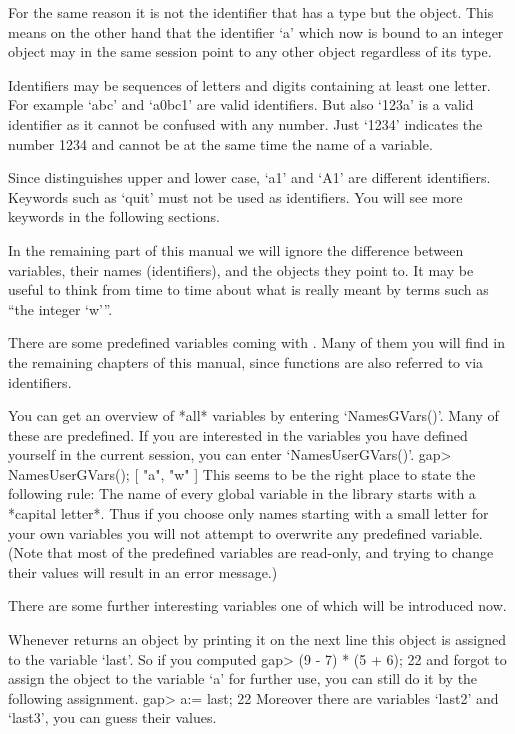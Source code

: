 For the  same reason it is  not the  identifier that has   a type but the
object.  This means  on the other hand that  the identifier `a' which now
is bound to an integer object may in the  same session point to any other
object regardless of its type.

Identifiers  may be sequences  of letters and digits containing at  least
one letter.   For example  `abc' and `a0bc1'  are valid identifiers.  But
also `123a'  is  a valid identifier as  it cannot be  confused  with  any
number.  Just `1234' indicates the  number 1234 and cannot be at the same
time the name of a variable.

Since  {\GAP} distinguishes  upper and  lower  case, `a1'  and  `A1'  are
different  identifiers.   Keywords  such as `quit'  must not  be used  as
identifiers.  You will see more keywords in the following sections.

In  the remaining  part of  this manual   we  will ignore the  difference
between variables, their names  (identifiers), and the objects they point
to.  It may be useful  to think from time  to  time about what is  really
meant by terms such as ``the integer `w'''.

There are some predefined variables coming with {\GAP}.  Many of them you
will find in the remaining  chapters of  this manual, since functions are
also referred to via identifiers.

You    can get   an  overview   of  *all*  {\GAP}   variables by entering
`NamesGVars()'.  Many of these are predefined.  If  you are interested in
the variables you  have defined yourself  in the current {\GAP}  session,
you can enter `NamesUserGVars()'.
\begintt
gap> NamesUserGVars();
[ "a", "w" ]
\endtt
This seems to be the  right place to state the  following rule:
The name of every global variable in the {\GAP} library starts with a
*capital letter*.
Thus if you choose only names starting with a small letter for your own
variables you will not attempt to overwrite any predefined variable.
(Note that most of the predefined variables are read-only,
and trying to change their values will result in an error message.)

There are some further interesting variables one of which will be
introduced now.

Whenever {\GAP} returns an object by printing it  on  the next  line this
object is assigned to the variable `last'.  So if you computed
\beginexample
gap> (9 - 7) * (5 + 6);
22 
\endexample
and forgot to assign the object to the  variable `a' for further use, you
can still do it by the following assignment.
\beginexample
gap> a:= last;
22 
\endexample
Moreover there are variables `last2' and `last3', you can guess their values.

